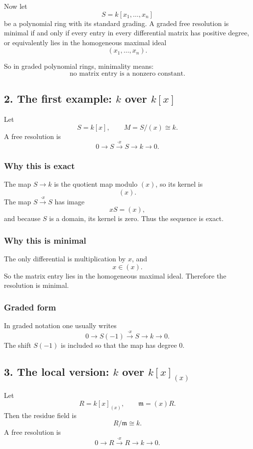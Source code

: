 \documentclass[12pt,a4paper]{article}
\theoremstyle{notespace}
\theoremstyle{definition}
\begin{document}
Now let
\[
S=k[x_1,\dots,x_n]
\]
be a polynomial ring with its standard grading.
A graded free resolution is minimal if and only if every entry in every differential matrix has positive degree, or equivalently lies in the homogeneous maximal ideal
\[
(x_1,\dots,x_n).
\]

So in graded polynomial rings, minimality means:
\[
\text{no matrix entry is a nonzero constant.}
\]

\subsection{2. The first example: \(k\) over \(k[x]\)}

Let
\[
S=k[x], \qquad M=S/(x)\cong k.
\]
A free resolution is
\[
0 \longrightarrow S \xrightarrow{\cdot x} S \longrightarrow k \longrightarrow 0.
\]

\subsubsection*{Why this is exact}

The map \(S\to k\) is the quotient map modulo \((x)\), so its kernel is
\[
(x).
\]
The map \(S\xrightarrow{\cdot x} S\) has image
\[
xS=(x),
\]
and because \(S\) is a domain, its kernel is zero.
Thus the sequence is exact.

\subsubsection*{Why this is minimal}

The only differential is multiplication by \(x\), and
\[
x\in (x).
\]
So the matrix entry lies in the homogeneous maximal ideal.
Therefore the resolution is minimal.

\subsubsection*{Graded form}

In graded notation one usually writes
\[
0 \longrightarrow S(-1) \xrightarrow{\cdot x} S \longrightarrow k \longrightarrow 0.
\]
The shift \(S(-1)\) is included so that the map has degree \(0\).

\subsection{3. The local version: \(k\) over \(k[x]_{(x)}\)}

Let
\[
R=k[x]_{(x)},
\qquad
\mathfrak m=(x)R.
\]
Then the residue field is
\[
R/\mathfrak m \cong k.
\]
A free resolution is
\[
0 \longrightarrow R \xrightarrow{\cdot x} R \longrightarrow k \longrightarrow 0.
\]
\end{document}
